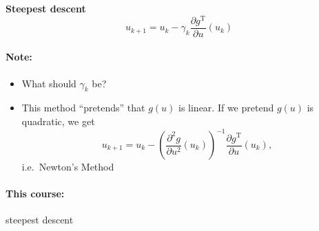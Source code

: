 \documentclass[letterpaper,12pt,titlepage]{report}
\newcommand{\trans}{^\text{T}}
\newcommand*\pder[2]{\frac{\partial #1}{\partial #2}}
\theoremstyle{plain}
\theoremstyle{definition}
\begin{document}
\begin{framed}
  \textbf{Steepest descent} \[ u_{k+1} = u_k - \gamma_k \pder{g\trans}{u} (u_k) \]
\end{framed}

\paragraph{Note:} \mbox{}
\begin{itemize}
\item What should $\gamma_k$ be?
\item This method ``pretends'' that $g(u)$ is linear. If we pretend $g(u)$ is quadratic, we get
  \[ u_{k+1} = u_k - \left( \pder{^2 g}{u^2} (u_k) \right)^{-1} \pder{g\trans}{u} (u_k), \]
  i.e.\ Newton's Method
\end{itemize}

\paragraph{This course:} steepest descent
\end{document}
